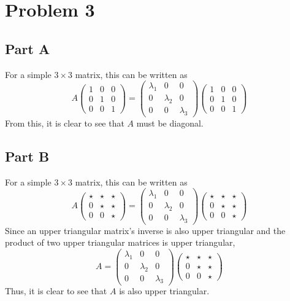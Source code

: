 \documentclass{article}
\begin{document}
\section*{Problem 3}

\subsection*{Part A}

For a simple $3 \times 3$ matrix, this can be written as
$$ A \begin{pmatrix}
  1 & 0 & 0 \\
  0 & 1 & 0 \\
  0 & 0 & 1
\end{pmatrix} = \begin{pmatrix}
  \lambda_1 & 0 & 0 \\ 
  0 & \lambda_2 & 0 \\
  0 & 0 & \lambda_3
\end{pmatrix} \begin{pmatrix}
  1 & 0 & 0 \\ 
  0 & 1 & 0 \\
  0 & 0 & 1
\end{pmatrix} $$
From this, it is clear to see that $A$ must be diagonal.

\subsection*{Part B}

For a simple $3 \times 3$ matrix, this can be written as
$$ A \begin{pmatrix}
  \star & \star & \star \\
  0 & \star & \star \\
  0 & 0 & \star
\end{pmatrix} = \begin{pmatrix}
  \lambda_1 & 0 & 0 \\ 
  0 & \lambda_2 & 0 \\
  0 & 0 & \lambda_3
\end{pmatrix} \begin{pmatrix}
  \star & \star & \star \\
  0 & \star & \star \\
  0 & 0 & \star
\end{pmatrix} $$
Since an upper triangular matrix's inverse is also upper triangular and the
product of two upper triangular matrices is upper triangular,
$$ A = \begin{pmatrix}
  \lambda_1 & 0 & 0 \\ 
  0 & \lambda_2 & 0 \\
  0 & 0 & \lambda_3
\end{pmatrix} \begin{pmatrix}
  \star & \star & \star \\
  0 & \star & \star \\
  0 & 0 & \star
\end{pmatrix} $$
Thus, it is clear to see that $A$ is also upper triangular.
\end{document}
